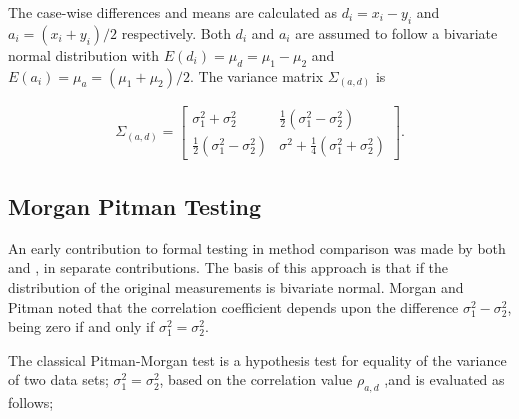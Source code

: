 \documentclass[Main.tex]{subfiles}
\begin{document}



The case-wise differences and means are calculated as $d_{i} =
x_{i}-y_{i}$ and $a_{i} = (x_{i}+y_{i})/2$  respectively. Both
$d_{i}$ and $a_{i}$ are assumed to follow a bivariate normal
distribution with $E(d_{i})= \mu_{d} = \mu_{1} - \mu_{2}$ and
$E(a_{i})= \mu_{a} = (\mu_{1} + \mu_{2})/2$. The variance matrix
$\Sigma_{(a,d)}$ is

\begin{eqnarray}
\Sigma_{(a,d)}= \left[\begin{matrix}
\sigma^{2}_{1}+\sigma^{2}_{2}&\frac{1}{2}(\sigma^{2}_{1}-\sigma^{2}_{2})\\
\frac{1}{2}(\sigma^{2}_{1}-\sigma^{2}_{2})&\sigma^{2}+
\frac{1}{4}(\sigma^{2}_{1}+\sigma^{2}_{2})
\end{matrix} \right].
\end{eqnarray}



\subsection{Morgan Pitman Testing}
An early contribution to formal testing in method comparison was
made by both \citet{morgan} and \citet{pitman}, in separate
contributions. The basis of this approach is that if the
distribution of the original measurements is bivariate normal.
Morgan and Pitman noted that the correlation coefficient depends
upon the difference $\sigma^{2}_{1}- \sigma^{2}_{2}$, being zero
if and only if $\sigma^{2}_{1}=\sigma^{2}_{2}$.

The classical Pitman-Morgan test is a hypothesis test for equality
of the variance of two data sets; $\sigma^{2}_{1} =
\sigma^{2}_{2}$, based on the correlation value $\rho_{a,d}$ ,and
is evaluated as follows;
\end{document}
